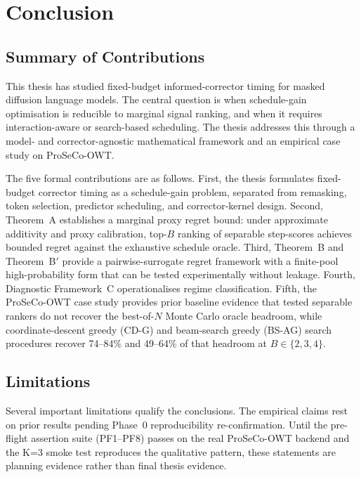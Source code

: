\chapter{Conclusion}
\label{ch:conclusion}

\section{Summary of Contributions}
\label{sec:ch8-summary}

This thesis has studied fixed-budget informed-corrector timing for masked
diffusion language models. The central question is when schedule-gain
optimisation is reducible to marginal signal ranking, and when it requires
interaction-aware or search-based scheduling. The thesis addresses this through
a model- and corrector-agnostic mathematical framework and an empirical case
study on ProSeCo-OWT.

The five formal contributions are as follows. First, the thesis formulates
fixed-budget corrector timing as a schedule-gain problem, separated from
remasking, token selection, predictor scheduling, and corrector-kernel design.
Second, Theorem~A establishes a marginal proxy regret bound: under approximate
additivity and proxy calibration, top-$B$ ranking of separable step-scores
achieves bounded regret against the exhaustive schedule oracle. Third,
Theorem~B and Theorem~B$'$ provide a pairwise-surrogate regret framework with
a finite-pool high-probability form that can be tested experimentally without
leakage. Fourth, Diagnostic Framework~C operationalises regime classification.
Fifth, the ProSeCo-OWT case study provides prior baseline evidence that tested
separable rankers do not recover the best-of-$N$ Monte Carlo oracle headroom,
while coordinate-descent greedy (CD-G) and beam-search greedy (BS-AG) search
procedures recover 74--84\% and 49--64\% of that headroom at $B\in\{2,3,4\}$.

\section{Limitations}
\label{sec:ch8-limitations}

Several important limitations qualify the conclusions. The empirical claims
rest on prior results pending Phase~0 reproducibility re-confirmation. Until
the pre-flight assertion suite (PF1--PF8) passes on the real ProSeCo-OWT
backend and the K=3 smoke test reproduces the qualitative pattern, these
statements are planning evidence rather than final thesis evidence.

